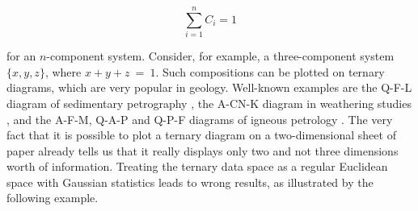 \documentclass[11pt]{article}
\begin{document}
\[
\sum_{i=1}^n C_i = 1
\]

for an $n$-component system. Consider, for example, a three-component
system $\{x,y,z\}$, where $x+y+z~=~1$. Such compositions can be
plotted on ternary diagrams, which are very popular in geology.
Well-known examples are the Q-F-L diagram of sedimentary petrography
\citep{garzanti2019}, the A-CN-K diagram in weathering studies
\citep{nesbitt1989}, and the A-F-M, Q-A-P and Q-P-F diagrams of
igneous petrology \citep{lemaitre2002}. The very fact that it is
possible to plot a ternary diagram on a two-dimensional sheet of paper
already tells us that it really displays only two and not three
dimensions worth of information. Treating the ternary data space as a
regular Euclidean space with Gaussian statistics leads to wrong
results, as illustrated by the following example.
\end{document}
